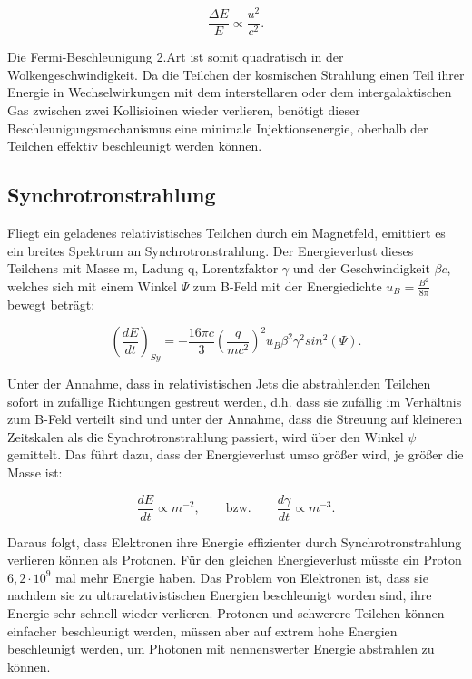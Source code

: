 \begin{equation}
 \frac{\Delta E}{E}\propto \frac{u^2}{c^2}.
\end{equation}

Die Fermi-Beschleunigung 2.Art ist somit quadratisch in der Wolkengeschwindigkeit.
Da die Teilchen der kosmischen Strahlung einen Teil ihrer Energie in Wechselwirkungen mit dem interstellaren oder dem intergalaktischen Gas zwischen zwei Kollisioinen wieder verlieren, benötigt dieser Beschleunigungsmechanismus eine minimale Injektionsenergie, oberhalb der Teilchen effektiv beschleunigt werden können.\cite{Grupen}\cite{Longair}


\subsection{Synchrotronstrahlung}
Fliegt ein geladenes relativistisches Teilchen durch ein Magnetfeld, emittiert es ein breites Spektrum an Synchrotronstrahlung.
Der Energieverlust dieses Teilchens mit Masse m, Ladung q, Lorentzfaktor $\gamma$ und der Geschwindigkeit $\beta c$, welches sich mit einem Winkel $\Psi$ zum B-Feld mit der Energiedichte $u_B=\frac{B^2}{8\pi}$ bewegt beträgt:

\begin{equation}
 \left( \frac{dE}{dt} \right)_{Sy} = - \frac{16 \pi c}{3} \left(\frac{q}{mc^2} \right)^2 u_B \beta^2 \gamma^2 sin^2(\Psi).
\end{equation}

Unter der Annahme, dass in relativistischen Jets die abstrahlenden Teilchen sofort in zufällige Richtungen gestreut werden, d.h. dass sie zufällig im Verhältnis zum B-Feld verteilt sind und unter der Annahme, dass die Streuung auf kleineren Zeitskalen als die Synchrotronstrahlung passiert, wird über den Winkel $\psi$ gemittelt.
Das führt dazu, dass der Energieverlust umso größer wird, je größer die Masse ist:

\begin{equation}
 \frac{dE}{dt}\propto m^{-2}, \qquad \text{bzw.} \qquad \frac{d\gamma}{dt}\propto m^{-3}.
\end{equation}

Daraus folgt, dass Elektronen ihre Energie effizienter durch Synchrotronstrahlung verlieren können als Protonen.
Für den gleichen Energieverlust müsste ein Proton $6,2 \cdot 10^9$ mal mehr Energie haben.
Das Problem von Elektronen ist, dass sie nachdem sie zu ultrarelativistischen Energien beschleunigt worden sind, ihre Energie sehr schnell wieder verlieren.
Protonen und schwerere Teilchen können einfacher beschleunigt werden,  müssen aber auf extrem hohe Energien beschleunigt werden, um Photonen mit nennenswerter Energie abstrahlen zu können.

